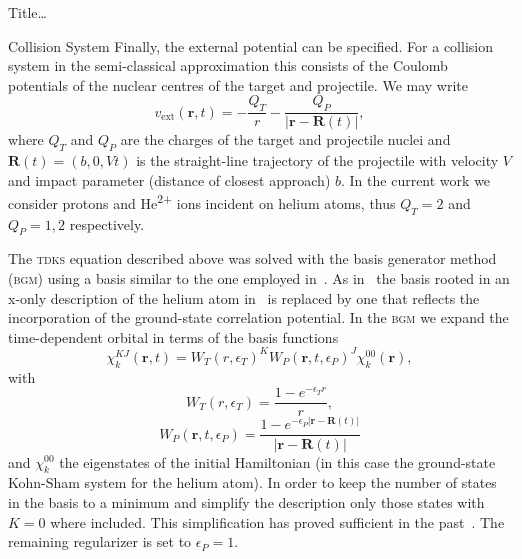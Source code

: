 \documentclass[letterpaper, 10 pt]{report}
\begin{document}
\begin{chapter}{ Title\dots \label{chap:p-he2p-he}}
\begin{section}{Collision System \label{sec:p-he2p-he-sys}}
      Finally, the external potential can be specified. For a collision system in the semi-classical
      approximation this consists of the Coulomb potentials of the nuclear centres of the target and
      projectile. We may write
      \begin{equation} \label{eq:phe2p-ext}
         v_\mathrm{ext}(\mathbf{r},t) = -\frac{Q_T}{r} 
         - \frac{Q_P}{\left| \mathbf{r} - \mathbf{R}(t) \right|},
      \end{equation}
      where $Q_T$ and $Q_P$ are the charges of the target and projectile nuclei and
      $\mathbf{R}(t) = (b,0,V t)$ is the straight-line trajectory of the projectile with velocity $V$ and
      impact parameter (distance of closest approach) $b$. In the current work we consider protons and
      He\textsuperscript{2+} ions incident on helium atoms, thus $Q_T = 2$ and $Q_P = 1,2$ respectively.

      The \textsc{tdks} equation described above was solved with the basis generator method~\cite{bgm}
      (\textsc{bgm}) using a basis similar to the one employed in~\cite{keim-ihe}. As in~\cite{pbarhe}
      the basis rooted in an x-only description of the helium atom in~\cite{keim-ihe} is replaced by one
      that reflects the incorporation of the ground-state correlation potential. In the \textsc{bgm} we
      expand the time-dependent orbital in terms of the basis functions
      \begin{equation}
         \chi^{KJ}_k (\mathbf{r},t)
         = W_T(r,\epsilon_T)^K W_P( \mathbf{r},t, \epsilon_P)^J \chi^{00}_k (\mathbf{r}),
      \end{equation}
      with
      \begin{equation}
         W_T(r,\epsilon_T) = \frac{1 - e^{-\epsilon_T r}}{r},
      \end{equation}
      \begin{equation}
         W_P (\mathbf{r},t,\epsilon_P)
         = \frac{1 - e^{-\epsilon_P|\mathbf{r} - \mathbf{R}(t)|}}{|\mathbf{r} - \mathbf{R}(t)|}
      \end{equation}
      and $\chi^{00}_k$ the eigenstates of the initial Hamiltonian (in this case the ground-state
      Kohn-Sham system for the helium atom). In order to keep the number of states in the basis to a
      minimum and simplify the description only those states with $K = 0$ where included. This
      simplification has proved sufficient in the past~\cite{bgm-rev}. The remaining regularizer is set
      to $\epsilon_P = 1$.


\end{section}
\end{chapter}
\end{document}

